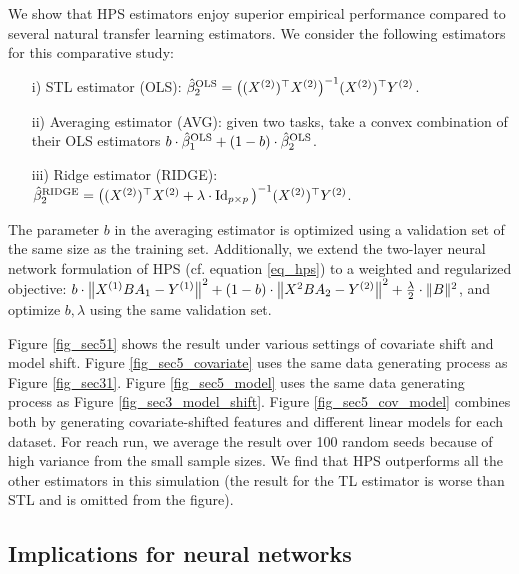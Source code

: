 We show that HPS estimators enjoy superior empirical performance compared to several natural transfer learning estimators.
We consider the following estimators for this comparative study:
\begin{enumerate}
    \item[i)] STL estimator (OLS): $\hat{\beta}_2^{\textup{OLS}} = \big((X^{(2)})^{\top} X^{(2)}\big)^{-1} (X^{(2)})^{\top} Y^{(2)}$.
    \item[ii)] Averaging estimator (AVG): given two tasks, take a convex combination of their OLS estimators $b \cdot \hat{\beta}^{\textup{OLS}}_1 + (1 - b) \cdot \hat{\beta}^{\textup{OLS}}_2$.
    \item[iii)] Ridge estimator (RIDGE): $\hat{\beta}_2^{\textup{RIDGE}} = \big((X^{(2)})^{\top} X^{(2)} + \lambda \cdot \operatorname{Id}_{p\times p}\big)^{-1} (X^{(2)})^{\top} Y^{(2)}$.
\end{enumerate}
The parameter $b$ in the averaging estimator is optimized using a validation set of the same size as the training set.
Additionally, we extend the two-layer neural network formulation of HPS (cf. equation \eqref{eq_hps}) to a weighted and regularized objective:
$b \cdot \left\| X^{(1)} B A_1 - Y^{(1)} \right\|^2 + (1 - b) \cdot  \left\| X^{2} B A_2 - Y^{(2)} \right\|^2 + \frac{\lambda}{2} \cdot \|B\|^2$, and optimize $b, \lambda$ using the same validation set.

Figure \ref{fig_sec51} shows the result under various settings of covariate shift and model shift.
Figure \ref{fig_sec5_covariate} uses the same data generating process as Figure \ref{fig_sec31}.
Figure \ref{fig_sec5_model} uses the same data generating process as Figure \ref{fig_sec3_model_shift}.
Figure \ref{fig_sec5_cov_model} combines both by generating covariate-shifted features and different linear models for each dataset.
For reach run, we average the result over 100 random seeds because of high variance from the small sample sizes.
We find that HPS outperforms all the other estimators in this simulation (the result for the TL estimator is worse than STL and is omitted from the figure).



\subsection{Implications for neural networks}

